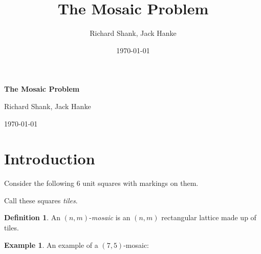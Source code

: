 \documentclass[12pt]{article}
\title{The Mosaic Problem}
\author{Richard Shank, Jack Hanke}
\date{\today}
\theoremstyle{plain}
\theoremstyle{definition}
\theoremstyle{remark}
\theoremstyle{definition}
\newtheorem{definition}{Definition}[section]
\newtheorem{exmp}{Example}[section]
\newcommand{\cellA}[4]{ \draw[thick] ( #1 , #2 ) rectangle ( #3 , #4 ); \draw[red, thick] (#3 * 0.5 + #1 * 0.5 , #2) -- (#3, #4 * 0.5 + #2 * 0.5);}
\newcommand{\cellB}[4]{ \draw[thick] ( #1 , #2 ) rectangle ( #3 , #4 ); \draw[red, thick] (#3 * 0.5 + #1 * 0.5 , #2) -- (#1, #4 * 0.5 + #2 * 0.5);}
\newcommand{\cellC}[4]{ \draw[thick] ( #1 , #2 ) rectangle ( #3 , #4 ); \draw[red, thick] (#3 * 0.5 + #1 * 0.5 , #4) -- (#1, #4 * 0.5 + #2 * 0.5);}
\newcommand{\cellD}[4]{ \draw[thick] ( #1 , #2 ) rectangle ( #3 , #4 ); \draw[red, thick] (#3 * 0.5 + #1 * 0.5 , #4) -- (#3, #4 * 0.5 + #2 * 0.5);}
\newcommand{\cellE}[4]{ \draw[thick] ( #1 , #2 ) rectangle ( #3 , #4 ); \draw[red, thick] (#3 * 0.5 + #1 * 0.5 , #2) -- (#3 * 0.5 + #1 * 0.5 , #4);}
\newcommand{\cellF}[4]{ \draw[thick] ( #1 , #2 ) rectangle ( #3 , #4 ); \draw[red, thick] (#3, #4 * 0.5 + #2 * 0.5) -- (#1, #4 * 0.5 + #2 * 0.5);}
\begin{document}
\begin{center}
    \Large
    \textbf{The Mosaic Problem}
    
    \vspace{0.4cm}
    \large
    
    Richard Shank, Jack Hanke   
    \vspace{0.4cm}
    
    \today
    \vspace{0.4cm}    
\end{center}

\section{Introduction}

Consider the following $6$ unit squares with markings on them.

\begin{center}
\end{center}

Call these squares \textit{tiles}. 

\begin{definition}
An $(n,m)$-\textit{mosaic} is an $(n,m)$ rectangular lattice made up of tiles.
\end{definition}

\begin{exmp}
An example of a $(7,5)$-mosaic:
\begin{center}
\end{center}
\end{exmp}
\end{document}
